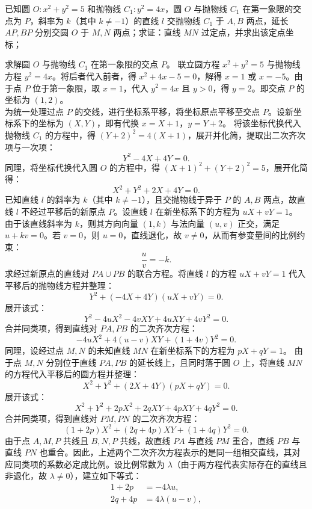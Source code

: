 \begin{example}
已知圆 \(O: x^2 + y^2 = 5\) 和抛物线 \(C_1: y^2 = 4x\)，圆 \(O\) 与抛物线 \(C_1\) 在第一象限的交点为 \(P\)，斜率为 \(k\)（其中 \(k \neq -1\)）的直线 \(l\) 交抛物线 \(C_1\) 于 \(A,B\) 两点，延长 \(AP,BP\) 分别交圆 \(O\) 于 \(M,N\) 两点；求证：直线 \(MN\) 过定点，并求出该定点坐标；
\end{example}
\begin{solution}
求解圆 $O$ 与抛物线 $C_1$ 在第一象限的交点 $P$。
联立圆方程 $x^2 + y^2 = 5$ 与抛物线方程 $y^2 = 4x$。将后者代入前者，得 $x^2 + 4x - 5 = 0$，解得 $x=1$ 或 $x=-5$。由于点 $P$ 位于第一象限，取 $x=1$，代入 $y^2 = 4x$ 且 $y>0$，得 $y=2$。即交点 $P$ 的坐标为 $(1, 2)$。\\
为统一处理过点 $P$ 的交线，进行坐标系平移，将坐标原点平移至交点 $P$。设新坐标系下的坐标为 $(X, Y)$，即有代换 $x = X + 1$，$y = Y + 2$。
将该坐标代换代入抛物线 $C_1$ 的方程中，得 $(Y+2)^2 = 4(X+1)$，展开并化简，提取出二次齐次项与一次项：
\[ Y^2 - 4X + 4Y = 0. \]
同理，将坐标代换代入圆 $O$ 的方程中，得 $(X+1)^2 + (Y+2)^2 = 5$，展开化简得：
\[ X^2 + Y^2 + 2X + 4Y = 0. \]
已知直线 $l$ 的斜率为 $k$（其中 $k \neq -1$），且交抛物线于异于 $P$ 的 $A, B$ 两点，故直线 $l$ 不经过平移后的新原点 $P$。设直线 $l$ 在新坐标系下的方程为 $uX + vY = 1$。
由于该直线斜率为 $k$，则其方向向量 $(1, k)$ 与法向量 $(u, v)$ 正交，满足 $u + kv = 0$。若 $v = 0$，则 $u = 0$，直线退化，故 $v \neq 0$，从而有参变量间的比例约束：
\[ \frac{u}{v} = -k. \]
求经过新原点的直线对 $PA \cup PB$ 的联合方程。将直线 $l$ 的方程 $uX + vY = 1$ 代入平移后的抛物线方程并整理：
\[ Y^2 + (-4X + 4Y)(uX + vY) = 0. \]
展开该式：
\[ Y^2 - 4uX^2 - 4vXY + 4uXY + 4vY^2 = 0. \]
合并同类项，得到直线对 $PA, PB$ 的二次齐次方程：
\[ -4u X^2 + 4(u-v) XY + (1+4v) Y^2 = 0. \]
同理，设经过点 $M, N$ 的未知直线 $MN$ 在新坐标系下的方程为 $pX + qY = 1$。
由于点 $M, N$ 分别位于直线 $PA, PB$ 的延长线上，且同时落于圆 $O$ 上，将直线 $MN$ 的方程代入平移后的圆方程并整理：
\[ X^2 + Y^2 + (2X + 4Y)(pX + qY) = 0. \]
展开该式：
\[ X^2 + Y^2 + 2pX^2 + 2qXY + 4pXY + 4qY^2 = 0. \]
合并同类项，得到直线对 $PM, PN$ 的二次齐次方程：
\[ (1+2p) X^2 + (2q+4p) XY + (1+4q) Y^2 = 0. \]
由于点 $A, M, P$ 共线且 $B, N, P$ 共线，故直线 $PA$ 与直线 $PM$ 重合，直线 $PB$ 与直线 $PN$ 也重合。因此，上述两个二次齐次方程表示的是同一组相交直线，其对应同类项的系数必定成比例。设比例常数为 $\lambda$（由于两方程代表实际存在的直线且非退化，故 $\lambda \neq 0$），建立如下等式：
\begin{align*}
1+2p &= -4\lambda u, \\
2q+4p &= 4\lambda(u-v), \\

\end{align*}
\end{solution}
